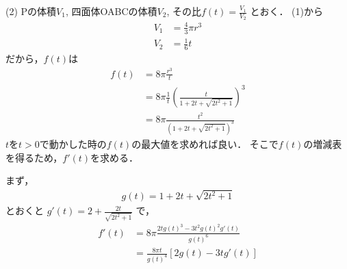 \documentclass[a4paper,10pt]{ltjsarticle}
\begin{document}
\begin{multicols}{2}
  \vspace{10pt}
  (2)
  Pの体積$V_1$, 四面体OABCの体積$V_2$, その比$f(t) = \frac{V_1}{V_2}$ とおく．
  (1)から
  \begin{align*}
    V_1 & = \frac{4}{3} \pi r^3 \\
    V_2 & = \frac{1}{6} t
  \end{align*}
  だから，$f(t)$は
  \begin{align}
    f(t) & = 8\pi \frac{r^3}{t}                                          \nonumber \\
         & = 8\pi \frac{1}{t}\left(\frac{t}{1+2t+\sqrt{2t^2+1}}\right)^3 \nonumber \\
         & = 8\pi \frac{t^2}{(1+2t+\sqrt{2t^2+1})^3} \label{eq:4}
  \end{align}
  $t$を$t>0$で動かした時の$f(t)$の最大値を求めれば良い．
  そこで$f(t)$の増減表を得るため，$f'(t)$を求める．

  まず，
  \begin{align}
    g(t) = 1+2t+\sqrt{2t^2+1}  \label{eq:5}
  \end{align}
  とおくと $g'(t) = 2 + \frac{2t}{\sqrt{2t^2+1}}$ で，
  \begin{align*}
    f'(t) & = 8\pi \frac{2t g(t)^3 - 3t^2 g(t)^2 g'(t)}{g(t)^6}      \\
          & = \frac{8\pi t}{g(t)^4} \left[ 2 g(t) - 3t g'(t) \right]
  \end{align*}


\end{multicols}
\end{document}
